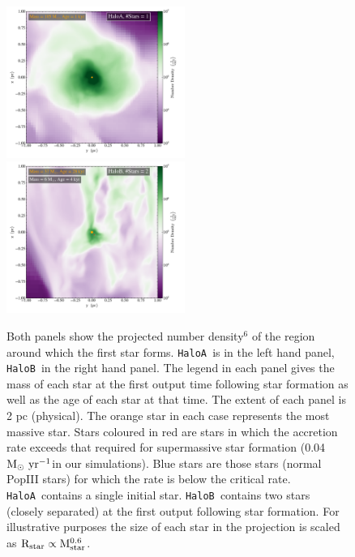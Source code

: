 \documentclass[twocolumn,iop,revtex4]{openjournal}
\newcommand{\msolaryrc} {$\rm{M_{\odot}~yr^{-1}}$}
\newcommand{\ha} {\texttt{HaloA~}}
\newcommand{\hb} {\texttt{HaloB~}}
\begin{document}
\begin{figure} 
\centering
\begin{minipage}{175mm}      \begin{center} 
\centerline{
\includegraphics[width=0.52\textwidth]{FIGURES/HaloA/Proj_z_number_density_0001.pdf}
\includegraphics[width=0.52\textwidth]{FIGURES/HaloB/Proj_z_number_density_0028.pdf}}
\caption{Both panels show the projected number density$^6$ of the region around which the first
  star forms. \ha is in the left hand panel, \hb in the right hand panel.
  The legend in each panel gives the mass of each star at the first output time following star
  formation as well as the age of each star at that time. The extent of each panel is 2 pc (physical). The orange
  star in each case represents the most massive star. Stars coloured in red are stars in which the accretion rate
  exceeds that required for supermassive star formation (0.04 \msolaryrc in our simulations).
  Blue stars are those stars
  (normal PopIII stars) for
  which the rate is below the critical rate. \ha contains a single initial star. \hb contains two stars (closely separated)
  at the first output following star formation. For illustrative purposes the size of each star in the
projection is scaled as $\rm{R_{star}} \propto \rm{M_{star}^{0.6}}$.}\label{Fig:ProjectionStart}
\end{center} \end{minipage}

\end{figure}
\end{document}
